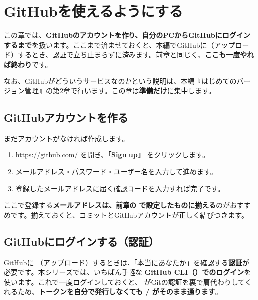 \chapter{GitHubを使えるようにする}

この章では、\textbf{GitHubのアカウントを作り、自分のPCからGitHubにログインするまで}を扱います。ここまで済ませておくと、本編でGitHubに（アップロード）するとき、認証で立ち止まらずに済みます。前章と同じく、\textbf{ここも一度やれば終わり}です。

なお、GitHubがどういうサービスなのかという説明は、本編『はじめてのバージョン管理』の第2章で行います。この章は\textbf{準備だけ}に集中します。

\section{GitHubアカウントを作る}

まだアカウントがなければ作成します。

\begin{enumerate}[leftmargin=1.6em]
  \item \url{https://github.com/} を開き、\textbf{「Sign up」} をクリックします。
  \item メールアドレス・パスワード・ユーザー名を入力して進めます。
  \item 登録したメールアドレスに届く確認コードを入力すれば完了です。
\end{enumerate}

\begin{hintbox}
ここで登録する\textbf{メールアドレスは、前章の  で設定したものに揃える}のがおすすめです。揃えておくと、コミットとGitHubアカウントが正しく結びつきます。
\end{hintbox}

\section{GitHubにログインする（認証）}

GitHubに （アップロード）するときは、「本当にあなたか」を確認する\textbf{認証}が必要です。本シリーズでは、いちばん手軽な \textbf{GitHub CLI（）でのログイン}を使います。これで一度ログインしておくと、 がGitの認証を裏で肩代わりしてくれるため、\textbf{トークンを自分で発行しなくても  /  がそのまま通ります}。


